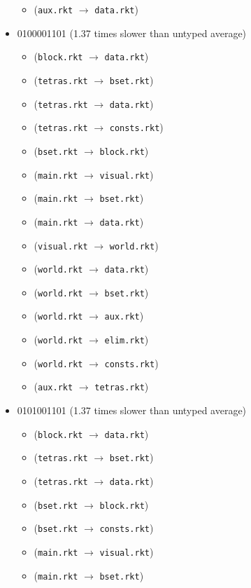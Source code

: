 \documentclass{article}
\newcommand{\mono}[1]{\texttt{#1}}
\begin{document}
\begin{itemize}
\begin{itemize}
  \item (\mono{aux.rkt} $\rightarrow$ \mono{data.rkt})
  \end{itemize}
\item 0100001101 (1.37 times slower than untyped average)
  \begin{itemize}
  \item (\mono{block.rkt} $\rightarrow$ \mono{data.rkt})
  \item (\mono{tetras.rkt} $\rightarrow$ \mono{bset.rkt})
  \item (\mono{tetras.rkt} $\rightarrow$ \mono{data.rkt})
  \item (\mono{tetras.rkt} $\rightarrow$ \mono{consts.rkt})
  \item (\mono{bset.rkt} $\rightarrow$ \mono{block.rkt})
  \item (\mono{main.rkt} $\rightarrow$ \mono{visual.rkt})
  \item (\mono{main.rkt} $\rightarrow$ \mono{bset.rkt})
  \item (\mono{main.rkt} $\rightarrow$ \mono{data.rkt})
  \item (\mono{visual.rkt} $\rightarrow$ \mono{world.rkt})
  \item (\mono{world.rkt} $\rightarrow$ \mono{data.rkt})
  \item (\mono{world.rkt} $\rightarrow$ \mono{bset.rkt})
  \item (\mono{world.rkt} $\rightarrow$ \mono{aux.rkt})
  \item (\mono{world.rkt} $\rightarrow$ \mono{elim.rkt})
  \item (\mono{world.rkt} $\rightarrow$ \mono{consts.rkt})
  \item (\mono{aux.rkt} $\rightarrow$ \mono{tetras.rkt})
  \end{itemize}
\item 0101001101 (1.37 times slower than untyped average)
  \begin{itemize}
  \item (\mono{block.rkt} $\rightarrow$ \mono{data.rkt})
  \item (\mono{tetras.rkt} $\rightarrow$ \mono{bset.rkt})
  \item (\mono{tetras.rkt} $\rightarrow$ \mono{data.rkt})
  \item (\mono{bset.rkt} $\rightarrow$ \mono{block.rkt})
  \item (\mono{bset.rkt} $\rightarrow$ \mono{consts.rkt})
  \item (\mono{main.rkt} $\rightarrow$ \mono{visual.rkt})
  \item (\mono{main.rkt} $\rightarrow$ \mono{bset.rkt})

\end{itemize}
\end{itemize}
\end{document}
